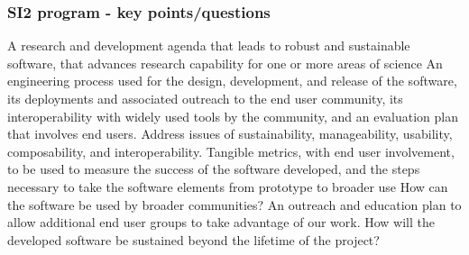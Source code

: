 \begin{frame}
\frametitle{SI2 program - key points/questions}


\footnotesize{
A research and development agenda that leads to robust and sustainable software, that advances research capability for one or more areas of science 
\vskip 0.12in
An engineering process used for the design, development, and release of the software, its deployments and associated outreach to the end user community, its interoperability with widely used tools by the community, and an evaluation plan that involves end users. Address issues of sustainability, manageability, usability, composability, and interoperability.
\vskip 0.12in
Tangible metrics, with end user involvement, to be used to measure the success of the software developed, and the steps necessary to take the software elements from prototype to broader use
\vskip 0.12in
How can the software be used by broader communities? 
\vskip 0.12in
\vskip 0.12in
An outreach and education plan to allow additional end user groups to take advantage of our work.
\vskip 0.12in
How will the developed software be sustained beyond the lifetime of the project?
}

\end{frame}



